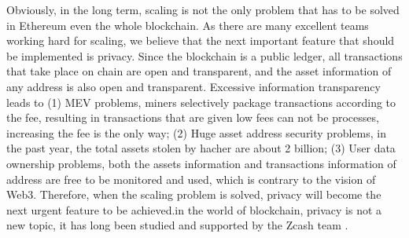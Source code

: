 Obviously, in the long term, scaling is not the only problem that has to be solved in Ethereum \cite{website:Ethereum} even the whole blockchain. As there are
many excellent teams working hard for scaling, we believe that the next important feature that should be implemented is privacy. Since the blockchain is 
a public ledger, all transactions that take place on chain are open and transparent, 
and the asset information of any address is also open and transparent. Excessive 
information transparency leads to (1) MEV problems, miners selectively package 
transactions according to the fee, resulting in transactions that are given low fees can not be 
processes, increasing the fee is the only way; (2) Huge asset address security problems, in the past 
year, the total assets stolen by hacher are about 2 billion; (3) User data 
ownership problems, both the assets information and transactions information of address are free to be monitored and used, which is contrary to 
the vision of Web3\cite{website:Web3}. Therefore, when the scaling problem is solved, privacy will become the next urgent feature to be achieved.in the world of 
blockchain, privacy is not a new topic, it has long been studied and supported by the Zcash team \cite{website:Zcash}.





